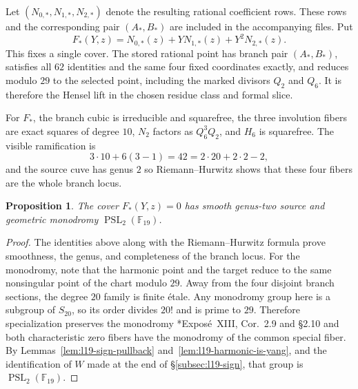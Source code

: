 \documentclass[10pt]{amsart}
\numberwithin{equation}{section}
\newtheorem{proposition}[theorem]{Proposition}
\theoremstyle{definition}
\theoremstyle{remark}
\newcommand{\F}{\mathbb{F}}
\newcommand{\PSL}{\operatorname{PSL}}
\begin{document}
Let $(N_{0,*},N_{1,*},N_{2,*})$ denote the resulting rational coefficient rows. These rows and the corresponding pair $(A_*,B_*)$ are included in the
  accompanying files. Put
\[
 F_*(Y,z)=N_{0,*}(z)+YN_{1,*}(z)+Y^2N_{2,*}(z).
\]
This fixes a single cover. The stored rational point has branch pair
$(A_*,B_*)$, satisfies all $62$ identities and the same four fixed coordinates exactly,
and reduces modulo $29$ to the selected point, including the marked divisors $Q_2$ and $Q_6$.  It is therefore the Hensel lift in the chosen residue class and formal slice. 

For $F_*$, the branch cubic is irreducible and squarefree, the
three involution fibers are exact squares of degree $10$, $N_2$ factors as
$Q_6^3Q_2$, and $H_6$ is squarefree.  The visible ramification is
\[
 3\cdot10+6(3-1)=42=2\cdot20+2\cdot2-2 ,
\]
and the source cuve has genus $2$ so Riemann--Hurwitz shows that these four fibers are the whole branch locus.


\begin{proposition}\label{prop:l19-target-cover}
The cover $F_*(Y,z)=0$ has smooth genus-two source and
geometric monodromy $\PSL_2(\F_{19})$.
\end{proposition}

\begin{proof}
The identities above along with the Riemann--Hurwitz formula prove smoothness, the genus, and completeness of the branch locus.  For the monodromy,
note that the harmonic point and the target reduce to the same nonsingular
point of the chart modulo $29$. Away from the four disjoint branch
sections, the degree $20$ family is finite \'etale.  Any monodromy group here
is a subgroup of $S_{20}$, so its order divides $20!$ and is prime to $29$.
Therefore specialization preserves the monodromy
\cite{SGA1}*{Expos\'e~XIII, Cor.~2.9 and \S2.10} and both
characteristic zero fibers have the monodromy of the common special fiber.
By Lemmas~\ref{lem:l19-sign-pullback}
and~\ref{lem:l19-harmonic-is-yang}, and the identification of $W$ made at the
end of \S\ref{subsec:l19-sign}, that group is $\PSL_2(\F_{19})$.


\end{proof}
\end{document}
